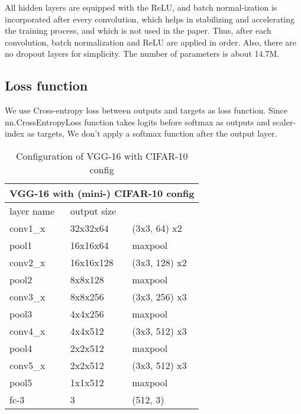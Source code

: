 \documentclass[extendedabs]{bmvc2k}
\begin{document}
All hidden layers are equipped with the ReLU\cite{alexnet}, and batch normal-ization\cite{batchnorm} is incorporated after every convolution, which helps in stabilizing and accelerating the training process, and which is not used in the paper\cite{vggnet_paper}. Thus, after each convolution, batch normalization and ReLU are applied in order. Also, there are no dropout layers for simplicity. The number of parameters is about 14.7M.

\subsection{Loss function} \label{lossfunction}
We use Cross-entropy loss between outputs and targets as loss function. Since nn.CrossEntropyLoss function takes logits before softmax as outputs and scaler-index as targets, We don't apply a softmax function after the output layer. 

\begin{table}[]
\centering
\begin{tabular}{|lll|}
\hline
\multicolumn{3}{|l|}{VGG-16 with (mini-) CIFAR-10 config}                           \\ \hline
\multicolumn{1}{|l|}{layer name} & \multicolumn{1}{l|}{output size} &               \\ \hline
\multicolumn{1}{|l|}{conv1\_x}   & \multicolumn{1}{l|}{32x32x64}    & (3x3, 64) x2  \\ \hline
\multicolumn{1}{|l|}{pool1}      & \multicolumn{1}{l|}{16x16x64}    & maxpool       \\ \hline
\multicolumn{1}{|l|}{conv2\_x}   & \multicolumn{1}{l|}{16x16x128}   & (3x3, 128) x2 \\ \hline
\multicolumn{1}{|l|}{pool2}      & \multicolumn{1}{l|}{8x8x128}     & maxpool       \\ \hline
\multicolumn{1}{|l|}{conv3\_x}   & \multicolumn{1}{l|}{8x8x256}     & (3x3, 256) x3 \\ \hline
\multicolumn{1}{|l|}{pool3}      & \multicolumn{1}{l|}{4x4x256}     & maxpool       \\ \hline
\multicolumn{1}{|l|}{conv4\_x}   & \multicolumn{1}{l|}{4x4x512}     & (3x3, 512) x3 \\ \hline
\multicolumn{1}{|l|}{pool4}      & \multicolumn{1}{l|}{2x2x512}     & maxpool       \\ \hline
\multicolumn{1}{|l|}{conv5\_x}   & \multicolumn{1}{l|}{2x2x512}     & (3x3, 512) x3 \\ \hline
\multicolumn{1}{|l|}{pool5}      & \multicolumn{1}{l|}{1x1x512}     & maxpool       \\ \hline
\multicolumn{1}{|l|}{fc-3}        & \multicolumn{1}{l|}{3}         & (512, 3)    \\ \hline

\end{tabular}

\caption{Configuration of VGG-16 with CIFAR-10 config}
\label{tab:vggnetwithcifar10}
\end{table}
\end{document}
